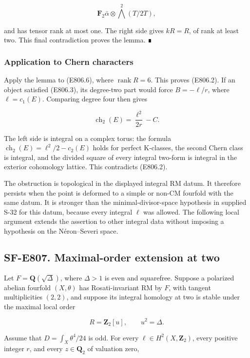 \[
 \mathbf F_2\bar\alpha\otimes
       \bigwedge^2(T/2T),
\]

and has tensor rank at most one. The right side gives \(kR=R\), of rank
at least two. This final contradiction proves the lemma. ∎

\subsubsection{Application to Chern
characters}\label{application-to-chern-characters}

Apply the lemma to (E806.6), where \(\operatorname{rank}R=6\). This
proves (E806.2). If an object satisfied (E806.3), its degree-two part
would force \(B=-\ell/r\), where \(\ell=c_1(E)\). Comparing degree four
then gives

\[
 \operatorname{ch}_2(E)=\frac{\ell^2}{2r}-C.
 \tag{E806.12}
\]

The left side is integral on a complex torus: the formula
\(\operatorname{ch}_2(E)=\ell^2/2-c_2(E)\) holds for perfect K-classes,
the second Chern class is integral, and the divided square of every
integral two-form is integral in the exterior cohomology lattice. This
contradicts (E806.2).

The obstruction is topological in the displayed integral RM datum. It
therefore persists when the point is deformed to a simple or non-CM
fourfold with the same datum. It is stronger than the
minimal-divisor-space hypothesis in supplied S-32 for this datum,
because every integral \(\ell\) was allowed. The following local
argument extends the assertion to other integral data without imposing a
hypothesis on the Néron--Severi space.

\subsection{SF-E807. Maximal-order extension at
two}\label{SF-E807}

Let \(F=\mathbf Q(\sqrt{\Delta})\), where \(\Delta>1\) is even and
squarefree. Suppose a polarized abelian fourfold \((X,\theta)\) has
Rosati-invariant RM by \(F\), with tangent multiplicities \((2,2)\), and
suppose its integral homology at two is stable under the maximal local
order

\[
 R=\mathbf Z_2[u],\qquad u^2=\Delta.
\]

Assume that \(D=\int_X\theta^4/24\) is odd. For every
\(\ell\in H^2(X,\mathbf Z_2)\), every positive integer \(r\), and every
\(z\in\mathbf Q_2\) of valuation zero,


